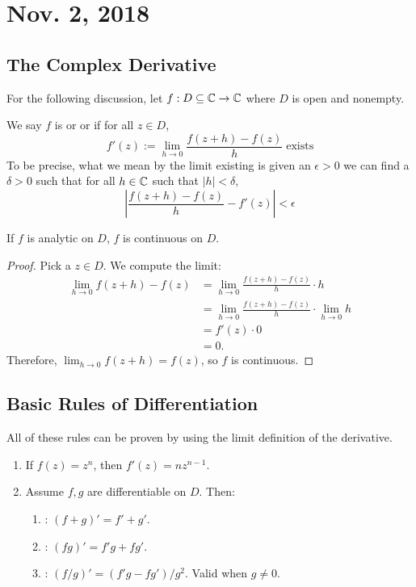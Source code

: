 \documentclass[notes]{subfile}
\begin{document}
\section{Nov. 2, 2018}
\subsection{The Complex Derivative}
For the following discussion, let $f: D \subseteq \operatorname{\mathbb{C}} \to \operatorname{\mathbb{C}}$ where $D$ is open and nonempty.

\begin{definition}
    We say $f$ is  or  or  if for all $z \in D$,
    \[ f'(z) := \lim_{h \to 0} \frac{f(z+h) - f(z)}{h} \; \text{exists} \]
    To be precise, what we mean by the limit existing is given an $\epsilon > 0$ 
    we can find a $\delta > 0$ such that for all $h \in \operatorname{\mathbb{C}}$ such that $|h| < \delta$,
    \[ \left| \frac{f(z+h) - f(z)}{h} - f'(z) \right| < \epsilon \] 

\end{definition}

\begin{theorem}
    If $f$ is analytic on $D$, $f$ is continuous on $D$.
\end{theorem}

\begin{proof}
    Pick a $z \in D$.
    We compute the limit:
    \begin{align*}
        \lim_{h \to 0} f(z+h) - f(z) &= \lim_{h\to 0} \frac{f(z+h)-f(z)}{h} \cdot h \\
        &= \lim_{h \to 0} \frac{f(z+h)-f(z)}{h} \cdot \lim_{h\to 0} h \\
        &= f'(z) \cdot 0 \\
        &= 0.
    \end{align*}
    Therefore, $\lim_{h \to 0} f(z+h) = f(z)$, so $f$ is continuous.
\end{proof}

\subsection{Basic Rules of Differentiation}
All of these rules can be proven by using the limit definition of the derivative.
\begin{enumerate}
    \item If $f(z) = z^n$, then $f'(z) = nz^{n-1}$.
    \item Assume $f,g$ are differentiable on $D$. Then:
    \begin{enumerate}
        \item {}: $(f + g)' = f' + g'$.
        \item {}: $(fg)' = f'g + fg'$.
        \item {}: $(f/g)' = (f'g - fg')/g^2$.  
        Valid when $g \ne 0$.
    \end{enumerate}
\end{enumerate}
\end{document}
